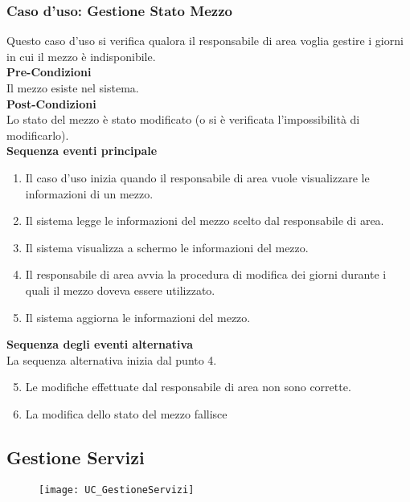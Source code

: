 \documentclass[green, fancy, 11pt]{elegantbook}
\begin{document}
\subsubsection{Caso d'uso: Gestione Stato Mezzo}
\noindent
Questo caso d’uso si verifica qualora il responsabile di area voglia gestire i giorni in cui il mezzo è indisponibile.\\
\textbf{Pre-Condizioni}\\
Il mezzo esiste nel sistema.\\
\textbf{Post-Condizioni}\\
Lo stato del mezzo è stato modificato (o si è verificata l’impossibilità di modificarlo).\\
\textbf{Sequenza eventi principale}
\begin{enumerate}
	\item Il caso d’uso inizia quando il responsabile di area vuole visualizzare le informazioni di un mezzo.
	\item Il sistema legge le informazioni del mezzo scelto dal responsabile di area.
	\item Il sistema visualizza a schermo le informazioni del mezzo.
	\item Il responsabile di area avvia la procedura di modifica dei giorni durante i quali il mezzo doveva essere utilizzato.
	\item Il sistema aggiorna le informazioni del mezzo.
\end{enumerate}
\textbf{Sequenza degli eventi alternativa}\\
La sequenza alternativa inizia dal punto 4.
\begin{enumerate}
	\setcounter{enumi}{4}
	\item Le modifiche effettuate dal responsabile di area non sono corrette.
	\item La modifica dello stato del mezzo fallisce
\end{enumerate}
\newpage

\subsection{Gestione Servizi}
\begin{figure}[H]
	\texttt{[image: UC\_GestioneServizi]}
\end{figure}
\end{document}
